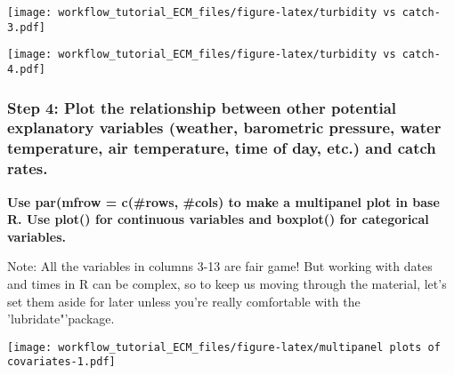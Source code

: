 \documentclass[]{article}
\newenvironment{Shaded}{\begin{snugshade}}{\end{snugshade}}
\newcommand{\DataTypeTok}[1]{\textcolor[rgb]{0.13,0.29,0.53}{#1}}
\newcommand{\DecValTok}[1]{\textcolor[rgb]{0.00,0.00,0.81}{#1}}
\newcommand{\KeywordTok}[1]{\textcolor[rgb]{0.13,0.29,0.53}{\textbf{#1}}}
\newcommand{\NormalTok}[1]{#1}
\newcommand{\OperatorTok}[1]{\textcolor[rgb]{0.81,0.36,0.00}{\textbf{#1}}}
\begin{document}
\texttt{[image: workflow\_tutorial\_ECM\_files/figure-latex/turbidity vs catch-3.pdf]}

\begin{Shaded}
\end{Shaded}

\texttt{[image: workflow\_tutorial\_ECM\_files/figure-latex/turbidity vs catch-4.pdf]}

\hypertarget{step-4-plot-the-relationship-between-other-potential-explanatory-variables-weather-barometric-pressure-water-temperature-air-temperature-time-of-day-etc.-and-catch-rates.}{%
\subsubsection{Step 4: Plot the relationship between other potential
explanatory variables (weather, barometric pressure, water temperature,
air temperature, time of day, etc.) and catch
rates.}\label{step-4-plot-the-relationship-between-other-potential-explanatory-variables-weather-barometric-pressure-water-temperature-air-temperature-time-of-day-etc.-and-catch-rates.}}

\textbf{Use par(mfrow = c(\#rows, \#cols) to make a multipanel plot in
base R. Use plot() for continuous variables and boxplot() for
categorical variables.}

Note: All the variables in columns 3-13 are fair game! But working with
dates and times in R can be complex, so to keep us moving through the
material, let's set them aside for later unless you're really
comfortable with the 'lubridate"'package.

\begin{Shaded}
\end{Shaded}

\texttt{[image: workflow\_tutorial\_ECM\_files/figure-latex/multipanel plots of covariates-1.pdf]}
\end{document}
